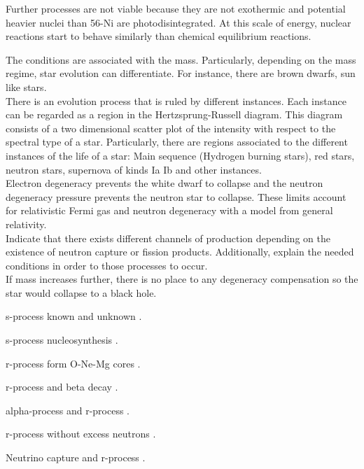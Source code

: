 \documentclass[openany]{book}
\begin{document}
Further processes are not viable because they are not exothermic and potential heavier nuclei than 56-Ni are photodisintegrated. At this scale of energy, nuclear reactions start to behave similarly than chemical equilibrium reactions. 

The conditions are associated with the mass. Particularly, depending on the mass regime, star evolution can differentiate. For instance, there are brown dwarfs, sun like stars. \\

There is an evolution process that is ruled by different instances. Each instance can be regarded as a region in the Hertzsprung-Russell diagram. This diagram consists of a two dimensional scatter plot of the intensity with respect to the spectral type of a star. Particularly, there are regions associated to the different instances of the life of a star: Main sequence (Hydrogen burning stars), red stars, neutron stars, supernova of kinds Ia Ib and other instances. \\

Electron degeneracy prevents the white dwarf to collapse and the neutron degeneracy pressure prevents the neutron star to collapse. These limits account for relativistic Fermi gas and neutron degeneracy with a model from general relativity. \\

Indicate that there exists different channels of production depending on the existence of neutron capture or fission products. Additionally, explain the needed conditions in order to those processes to occur. \\ 

If mass increases further, there is no place to any degeneracy compensation so the star would collapse to a black hole.

s-process known and unknown \cite{lattanzio_lugaro_2005}.

s-process nucleosynthesis \cite{kappeler_2005}.

r-process form O-Ne-Mg cores \cite{wanajo_tamamura_itoh_nomoto_ishimaru_beers_nozawa_2003}.

r-process and beta decay \cite{suzuki_shibagaki_yoshida_kajino_otsuka_2018}.

alpha-process and r-process \cite{woosley_hoffman_1992}.

r-process without excess neutrons \cite{meyer_2002}.

Neutrino capture and r-process \cite{meyer_mclaughlin_fuller_1998}.
\end{document}
